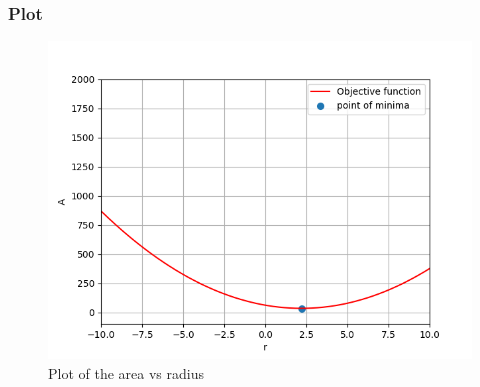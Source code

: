 \documentclass{beamer}
\theoremstyle{remark}
\numberwithin{equation}{section}
\begin{document}
\begin{frame}
      \frametitle{Plot}
	\begin{figure}[h!]
	\centering
	\includegraphics[width=1\columnwidth]{figs/simulated.png}
	\caption{Plot of the area vs radius}
	\label{stemplot}
\end{figure}
\end{frame}
\end{document}
